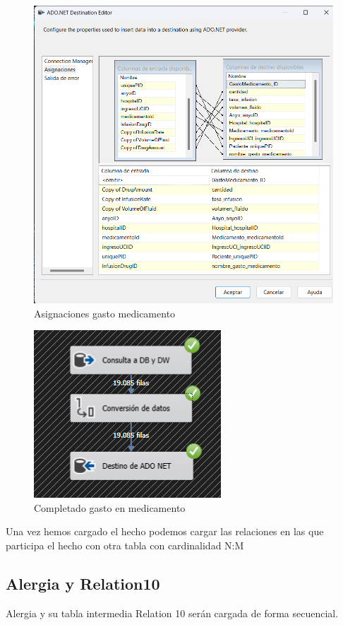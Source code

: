 \documentclass{article}
\begin{document}
	\begin{figure}[H]
		\centering
		\includegraphics[width=.7\linewidth]{./images/asignaciones/gasto_medicamento.png}
		\caption{Asignaciones gasto medicamento}
	\end{figure}
	\begin{figure}[H]
		\centering
		\includegraphics[width=.3\linewidth]{./images/completados/gasto_medicamento.png}
		\caption{Completado gasto en medicamento}
	\end{figure}
	
	Una vez hemos cargado el hecho podemos cargar las relaciones en las que participa el hecho con otra tabla con cardinalidad N:M
	\subsection{Alergia y Relation10}
	Alergia y su tabla intermedia Relation 10 serán cargada de forma secuencial.
\end{document}
